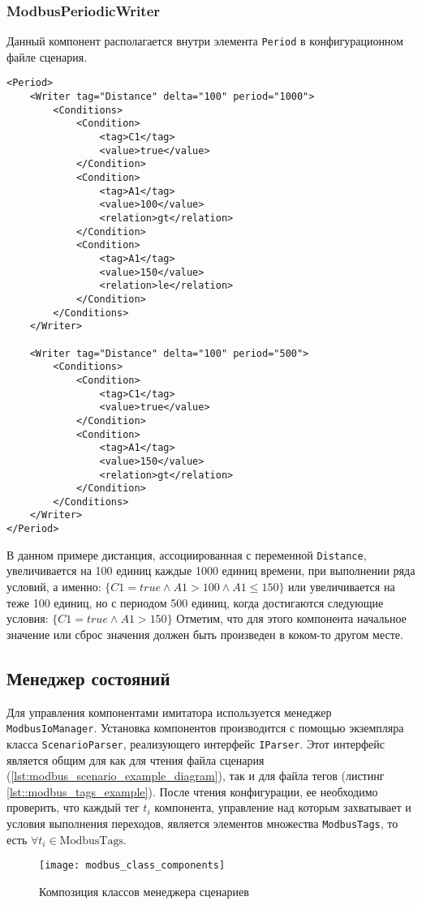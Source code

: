 \subsubsection{ModbusPeriodicWriter}
Данный компонент располагается внутри элемента \texttt{Period} в конфигурационном файле сценария.
\begin{lstlisting}[language=MyXML]
<Period>
    <Writer tag="Distance" delta="100" period="1000">
        <Conditions>
            <Condition>
                <tag>C1</tag>
                <value>true</value>
            </Condition>
            <Condition>
                <tag>A1</tag>
                <value>100</value>
                <relation>gt</relation>
            </Condition>
            <Condition>
                <tag>A1</tag>
                <value>150</value>
                <relation>le</relation>
            </Condition>
        </Conditions>
    </Writer>

    <Writer tag="Distance" delta="100" period="500">
        <Conditions>
            <Condition>
                <tag>C1</tag>
                <value>true</value>
            </Condition>
            <Condition>
                <tag>A1</tag>
                <value>150</value>
                <relation>gt</relation>
            </Condition>
        </Conditions>
    </Writer>
</Period>
\end{lstlisting}
В данном примере дистанция, ассоциированная с переменной \texttt{Distance}, увеличивается на 100 единиц каждые 1000 единиц времени,
при выполнении ряда условий, а именно: $\{C1 = true \wedge A1 > 100 \wedge A1 \le 150 \}$ или
увеличивается на теже 100 единиц, но с периодом 500 единиц, когда достигаются следующие условия:
$\{C1 = true \wedge A1 > 150\}$
Отметим, что для этого компонента начальное значение или сброс значения должен быть произведен в коком-то
другом месте.



\subsection{Менеджер состояний}
Для управления компонентами имитатора используется менеджер \texttt{ModbusIoManager}. Установка компонентов производится с помощью экземпляра класса \texttt{ScenarioParser}, реализующего интерфейс \texttt{IParser}.
Этот интерфейс является общим для как для чтения файла сценария (\ref{lst:modbus_scenario_example_diagram}),
так и для файла тегов (листинг \ref{lst::modbus_tags_example}).
После чтения конфигурации, ее необходимо проверить, что каждый тег $t_i$
компонента, управление над которым захватывает и условия выполнения переходов, является элементов множества \texttt{ModbusTags},
то есть $\forall t_i \in \mbox{ModbusTags}$.
\begin{landscape}
    \begin{center}
        \begin{figure}
            \texttt{[image: modbus\_class\_components]}
            \caption{Композиция классов менеджера сценариев}\label{fig:modbus_class_components}
        \end{figure}
    \end{center}
\end{landscape}


